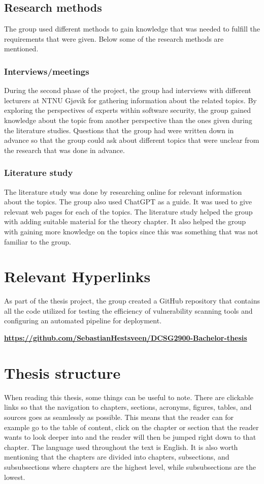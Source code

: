 \subsection{Research methods}
The group used different methods to gain knowledge that was needed to fulfill the requirements that were given. Below some of the research methods are mentioned. 

\subsubsection{Interviews/meetings}
During the second phase of the project, the group had interviews with different lecturers at NTNU Gjøvik for gathering information about the related topics. By exploring the perspectives of experts within software security, the group gained knowledge about the topic from another perspective than the ones given during the literature studies. Questions that the group had were written down in advance so that the group could ask about different topics that were unclear from the research that was done in advance.   

\subsubsection{Literature study}
The literature study was done by researching online for relevant information about the topics. The group also used ChatGPT as a guide. It was used to give relevant web pages for each of the topics. The literature study helped the group with adding suitable material for the theory chapter. It also helped the group with gaining more knowledge on the topics since this was something that was not familiar to the group. 

\section{Relevant Hyperlinks}
As part of the thesis project, the group created a GitHub repository that contains all the code utilized for testing the efficiency of vulnerability scanning tools and configuring an automated pipeline for deployment. 

\href{https://github.com/SebastianHestsveen/DCSG2900-Bachelor-thesis}{\textbf{https://github.com/SebastianHestsveen/DCSG2900-Bachelor-thesis}}

\section{Thesis structure}
When reading this thesis, some things can be useful to note. There are clickable links so that the navigation to chapters, sections, acronyms, figures, tables, and sources goes as seamlessly as possible. This means that the reader can for example go to the table of content, click on the chapter or section that the reader wants to look deeper into and the reader will then be jumped right down to that chapter. The language used throughout the text is English. It is also worth mentioning that the chapters are divided into chapters, subsections, and subsubsections where chapters are the highest level, while subsubsections are the lowest. 
\newpage
